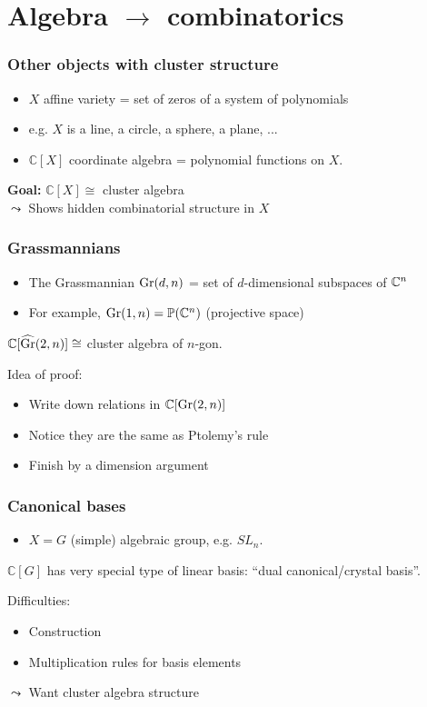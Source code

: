 \documentclass[aspectratio=169]{beamer}
\begin{document}
\section{Algebra $\to$ combinatorics}

\begin{frame}
	\frametitle{Other objects with cluster structure}

	\begin{itemize}
		\item $X$ affine variety = set of zeros of a system of polynomials
		\item e.g. $X$ is a line, a circle, a sphere, a plane, ... \pause
		\item $\mathbb{C}[X]$ coordinate algebra = polynomial functions on $X$.
	\end{itemize}
	\pause
	\textbf{Goal:} $\mathbb{C}[X] \cong$ cluster algebra
	\\
	$\leadsto$ Shows hidden combinatorial structure in $X$

\end{frame}

\begin{frame}
	\frametitle{Grassmannians}
	\begin{itemize}
		\item The Grassmannian $\operatorname{Gr}(d,n)$ = set of $d$-dimensional subspaces of $\mathbb{C}^n$
		\item For example, $\operatorname{Gr}(1, n) = \mathbb{P}(\mathbb{C}^n)$ (projective space)
	\end{itemize}
	\pause
	\begin{theorem}
		$\mathbb{C}[\widehat{\operatorname{Gr}}(2,n)] \cong $ cluster algebra of $n$-gon.
	\end{theorem}
	\pause
	Idea of proof:
	\begin{itemize}
		\item Write down relations in $\mathbb{C}[\operatorname{Gr}(2,n)]$
		\item Notice they are the same as Ptolemy's rule
		\item Finish by a dimension argument
	\end{itemize}

\end{frame}

\begin{frame}
	\frametitle{Canonical bases}

	\begin{itemize}
		\item $X = G$ (simple) algebraic group, e.g. $SL_n$.
	\end{itemize}
	\pause
	\begin{theorem}
		$\mathbb{C}[G]$ has very special type of linear basis: ``dual canonical/crystal basis''.
	\end{theorem}
	\pause
	Difficulties:
	\begin{itemize}
		\item Construction
		\item Multiplication rules for basis elements
	\end{itemize}
	\pause
	$\leadsto$ Want cluster algebra structure

\end{frame}
\end{document}
